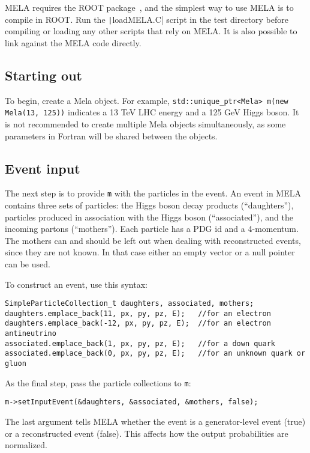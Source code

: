 \documentclass[aps,superscriptaddress,nofootinbib]{revtex4}
\begin{document}
MELA requires the ROOT package~\cite{root}, and the simplest way to use MELA is to compile in ROOT.  Run the \texttt|loadMELA.C| script in the test directory before compiling or loading any other scripts that rely on MELA.  It is also possible to link against the MELA code directly.

\subsection{Starting out}
To begin, create a Mela object.  For example, \verb|std::unique_ptr<Mela> m(new Mela(13, 125))| indicates a 13 TeV LHC energy and a 125 GeV Higgs boson.  It is not recommended to create multiple Mela objects simultaneously, as some parameters in Fortran will be shared between the objects.

\subsection{Event input}
The next step is to provide \texttt{m} with the particles in the event.  An event in MELA contains three sets of particles: the Higgs boson decay products (``daughters''), particles produced in association with the Higgs boson (``associated''), and the incoming partons (``mothers'').  Each particle has a PDG id and a 4-momentum.  The mothers can and should be left out when dealing with reconstructed events, since they are not known.  In that case either an empty vector or a null pointer can be used.

To construct an event, use this syntax:
\begin{verbatim}
SimpleParticleCollection_t daughters, associated, mothers;
daughters.emplace_back(11, px, py, pz, E);   //for an electron
daughters.emplace_back(-12, px, py, pz, E);  //for an electron antineutrino
associated.emplace_back(1, px, py, pz, E);   //for a down quark
associated.emplace_back(0, px, py, pz, E);   //for an unknown quark or gluon
\end{verbatim}

As the final step, pass the particle collections to \texttt{m}:
\begin{verbatim}
m->setInputEvent(&daughters, &associated, &mothers, false);
\end{verbatim}
The last argument tells MELA whether the event is a generator-level event (true) or a reconstructed event (false).  This affects how the output probabilities are normalized.
\end{document}
